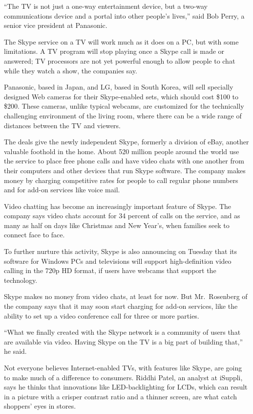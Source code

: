 ﻿\documentclass[12pt]{article}
\begin{document}
``The TV is not just a one-way entertainment device, but a two-way communications device and a
portal into other people's lives,'' said Bob Perry, a senior vice president at Panasonic.

The Skype service on a TV will work much as it does on a PC, but with some limitations. A TV program
will stop playing once a Skype call is made or answered; TV processors are not yet powerful enough
to allow people to chat while they watch a show, the companies say.

Panasonic, based in Japan, and LG, based in South Korea, will sell specially designed Web cameras
for their Skype-enabled sets, which should cost \$100 to \$200. These cameras, unlike typical
webcams, are customized for the technically challenging environment of the living room, where there
can be a wide range of distances between the TV and viewers.

The deals give the newly independent Skype, formerly a division of eBay, another valuable foothold
in the home. About 520 million people around the world use the service to place free phone calls and
have video chats with one another from their computers and other devices that run Skype software.
The company makes money by charging competitive rates for people to call regular phone numbers and
for add-on services like voice mail.

Video chatting has become an increasingly important feature of Skype. The company says video chats
account for 34 percent of calls on the service, and as many as half on days like Christmas and New
Year's, when families seek to connect face to face.

To further nurture this activity, Skype is also announcing on Tuesday that its software for Windows
PCs and televisions will support high-definition video calling in the 720p HD format, if users have
webcams that support the technology.

Skype makes no money from video chats, at least for now. But Mr.~Rosenberg of the company says that
it may soon start charging for add-on services, like the ability to set up a video conference call
for three or more parties.

``What we finally created with the Skype network is a community of users that are available via
video. Having Skype on the TV is a big part of building that,'' he said.

Not everyone believes Internet-enabled TVs, with features like Skype, are going to make much of a
difference to consumers. Riddhi Patel, an analyst at iSuppli, says he thinks that innovations like
LED-backlighting for LCDs, which can result in a picture with a crisper contrast ratio and a thinner
screen, are what catch shoppers' eyes in stores.
\end{document}
